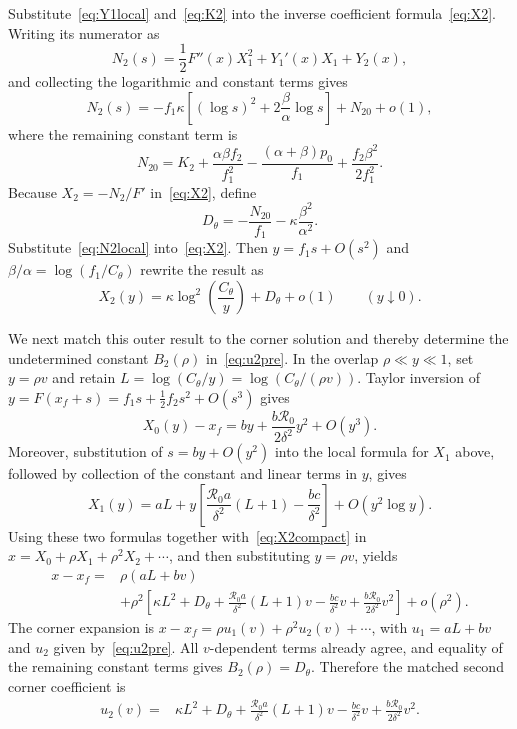 \documentclass[11pt,a4paper]{article}
\newcommand{\Rzero}{\mathcal R_0}
\newcommand{\xf}{x_f}
\begin{document}
Substitute~\eqref{eq:Y1local} and~\eqref{eq:K2} into the inverse coefficient
formula~\eqref{eq:X2}. Writing its numerator as
\begin{equation}
N_2(s)=\frac12F''(x)X_1^2+Y_1'(x)X_1+Y_2(x),
\label{eq:N2def}
\end{equation}
and collecting the logarithmic and constant terms gives
\begin{equation}
N_2(s)=-f_1\kappa\left[(\log s)^2
+2\frac{\beta}{\alpha}\log s\right]+N_{20}+o(1),
\label{eq:N2local}
\end{equation}
where the remaining constant term is
\begin{equation}
\label{eq:N20}
N_{20}=K_2+\frac{\alpha\beta f_2}{f_1^2}
-\frac{(\alpha+\beta)p_0}{f_1}
+\frac{f_2\beta^2}{2f_1^2}.
\end{equation}
Because $X_2=-N_2/F'$ in~\eqref{eq:X2}, define
\begin{equation}
\label{eq:Dquadrature}
D_\theta=-\frac{N_{20}}{f_1}-\kappa\frac{\beta^2}{\alpha^2}.
\end{equation}
Substitute~\eqref{eq:N2local} into~\eqref{eq:X2}. Then
$y=f_1s+O(s^2)$ and
$\beta/\alpha=\log(f_1/C_\theta)$ rewrite the result as
\begin{equation}
\label{eq:X2compact}
X_2(y)=\kappa\log^2\!\left(\frac{C_\theta}{y}\right)+D_\theta+o(1)
\qquad (y\downarrow0).
\end{equation}

We next match this outer result to the corner solution and thereby determine
the undetermined constant $B_2(\rho)$ in~\eqref{eq:u2pre}.  In the overlap
$\rho\ll y\ll1$, set $y=\rho v$ and retain
$L=\log(C_\theta/y)=\log(C_\theta/(\rho v))$.  Taylor inversion of
$y=F(\xf+s)=f_1s+\tfrac12f_2s^2+O(s^3)$ gives
\[
X_0(y)-\xf=by+\frac{b\Rzero}{2\delta^2}y^2+O(y^3).
\]
Moreover, substitution of $s=by+O(y^2)$ into the local formula for $X_1$
above, followed by collection of the constant and linear terms in $y$, gives
\[
X_1(y)=aL+y\left[
\frac{\Rzero a}{\delta^2}(L+1)-\frac{bc}{\delta^2}
\right]+O(y^2\log y).
\]
Using these two formulas together with~\eqref{eq:X2compact} in
$x=X_0+\rho X_1+\rho^2X_2+\cdots$, and then substituting $y=\rho v$, yields
\begin{align*}
x-\xf={}&\rho(aL+bv)\\
&+\rho^2\left[
\kappa L^2+D_\theta
+\frac{\Rzero a}{\delta^2}(L+1)v
-\frac{bc}{\delta^2}v
+\frac{b\Rzero}{2\delta^2}v^2
\right]+o(\rho^2).
\end{align*}
The corner expansion is
$x-\xf=\rho u_1(v)+\rho^2u_2(v)+\cdots$, with
$u_1=aL+bv$ and $u_2$ given by~\eqref{eq:u2pre}.  All $v$-dependent terms
already agree, and equality of the remaining constant terms gives
$B_2(\rho)=D_\theta$.  Therefore the matched second corner coefficient is
\begin{equation}
\label{eq:u2}
\begin{split}
u_2(v)={}&\kappa L^2+D_\theta
+\frac{\Rzero a}{\delta^2}(L+1)v
-\frac{bc}{\delta^2}v
+\frac{b\Rzero}{2\delta^2}v^2.
\end{split}
\end{equation}
\end{document}
